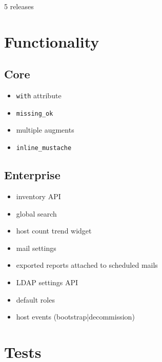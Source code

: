 \documentclass[11pt]{article}
\begin{document}
5 releases

\section*{Functionality}
\label{sec:org06237f0}
\subsection*{Core}
\label{sec:orgc948160}
\begin{itemize}
\item \texttt{with} attribute
\item \texttt{missing\_ok}
\item multiple augments
\item \texttt{inline\_mustache}
\end{itemize}

\subsection*{Enterprise}
\label{sec:org569e066}
\begin{itemize}
\item inventory API
\item global search
\item host count trend widget
\item mail settings
\item exported reports attached to scheduled mails
\item LDAP settings API
\item default roles
\item host events (bootstrap|decommission)
\end{itemize}

\section*{Tests}
\label{sec:orgd830285}
\end{document}
